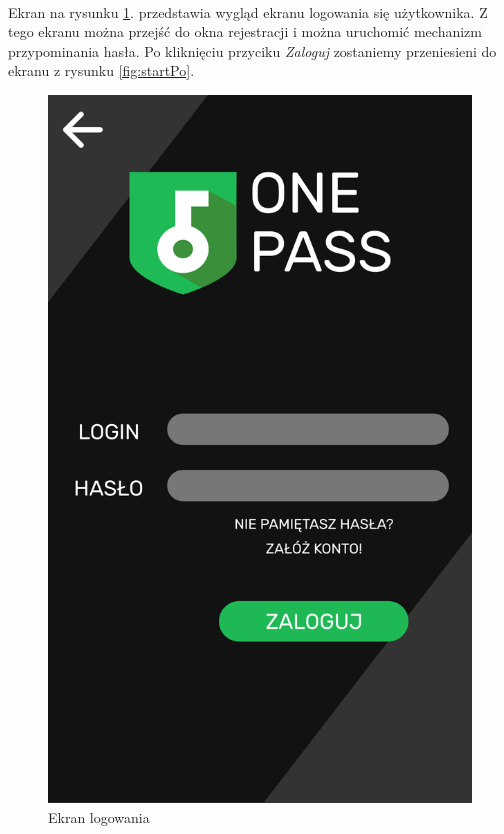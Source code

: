 \documentclass[a4paper]{article}
\begin{document}
\newpage

\paragraph{}Ekran na rysunku \ref{fig:logowanie}. przedstawia wygląd ekranu logowania się użytkownika. Z tego ekranu można przejść do okna rejestracji i można uruchomić mechanizm przypominania hasła. Po kliknięciu przyciku \textit{Zaloguj} zostaniemy przeniesieni do ekranu z rysunku \ref{fig:startPo}.
\begin{figure}[H]
    \centering
    \includegraphics[height = 1\textwidth]{img/ekran_logowania.png}
    \caption{Ekran logowania}
    \label{fig:logowanie}
\end{figure}

\newpage
\end{document}
